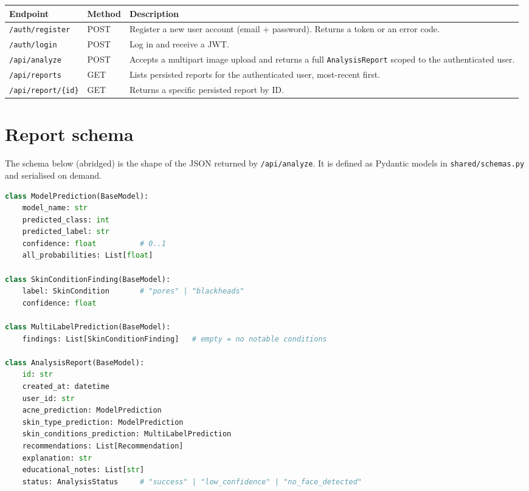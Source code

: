 \documentclass[11pt,a4paper,oneside]{report}
\begin{document}
\begin{longtable}{@{}p{4.4cm}p{1.7cm}p{7.6cm}@{}}
    \toprule
    \textbf{Endpoint} & \textbf{Method} & \textbf{Description} \\
    \midrule
    \endhead
    \texttt{/auth/register}      & POST & Register a new user account (email + password). Returns a token or an error code. \\
    \texttt{/auth/login}         & POST & Log in and receive a JWT. \\
    \texttt{/api/analyze}        & POST & Accepts a multipart image upload and returns a full \texttt{AnalysisReport} scoped to the authenticated user. \\
    \texttt{/api/reports}        & GET  & Lists persisted reports for the authenticated user, most-recent first. \\
    \texttt{/api/report/\{id\}}  & GET  & Returns a specific persisted report by ID. \\
    \bottomrule
\end{longtable}

\chapter{Report schema}

The schema below (abridged) is the shape of the JSON returned by
\texttt{/api/analyze}. It is defined as Pydantic models in
\texttt{shared/schemas.py} and serialised on demand.

\begin{lstlisting}[language=Python,caption={AnalysisReport (abridged).}]
class ModelPrediction(BaseModel):
    model_name: str
    predicted_class: int
    predicted_label: str
    confidence: float          # 0..1
    all_probabilities: List[float]

class SkinConditionFinding(BaseModel):
    label: SkinCondition       # "pores" | "blackheads"
    confidence: float

class MultiLabelPrediction(BaseModel):
    findings: List[SkinConditionFinding]   # empty = no notable conditions

class AnalysisReport(BaseModel):
    id: str
    created_at: datetime
    user_id: str
    acne_prediction: ModelPrediction
    skin_type_prediction: ModelPrediction
    skin_conditions_prediction: MultiLabelPrediction
    recommendations: List[Recommendation]
    explanation: str
    educational_notes: List[str]
    status: AnalysisStatus     # "success" | "low_confidence" | "no_face_detected"
\end{lstlisting}
\end{document}
